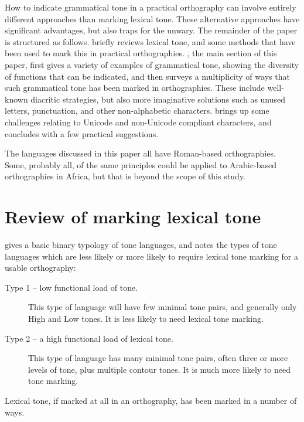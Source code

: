 \documentclass[output=paper]{langscibook}
\begin{document}
\begin{sloppypar}
How to indicate grammatical tone in a practical orthography can involve entirely different approaches than marking lexical tone. These alternative approaches have significant advantages, but also traps for the unwary.  The remainder of the paper is structured as follows.  briefly reviews lexical tone, and some methods that have been used to mark this in practical orthographies. , the main section of this paper, first gives a variety of examples of grammatical tone, showing the diversity of functions that can be indicated, and then surveys a multiplicity of ways that such grammatical tone has been marked in orthographies. These include well-known diacritic strategies, but also more imaginative solutions such as unused letters, punctuation, and other non-alphabetic characters.  brings up some challenges relating to Unicode and non-Unicode compliant characters, and  concludes with a few practical suggestions.
\end{sloppypar}

The languages discussed in this paper all have Roman-based orthographies. Some, probably all, of the same principles could be applied to Arabic-based orthographies in Africa, but that is beyond the scope of this study. 

\section{Review of marking lexical tone}\label{sec:cahill:2}

\citet{KutschLojenga2014} gives a basic binary typology of tone languages, and notes the types of tone languages which are less likely or more likely to require lexical tone marking for a usable orthography: 

\begin{description}
  \item[Type 1 – low functional load of tone.] This type of language will have few minimal tone pairs, and generally only High and Low tones. It is less likely to need lexical tone marking.
  \item[Type 2 – a high functional load of lexical tone.] This type of language has many minimal tone pairs, often three or more levels of tone, plus multiple contour tones. It is much more likely to need tone marking.
\end{description}

Lexical tone, if marked at all in an orthography, has been marked in a number of ways.
\end{document}
